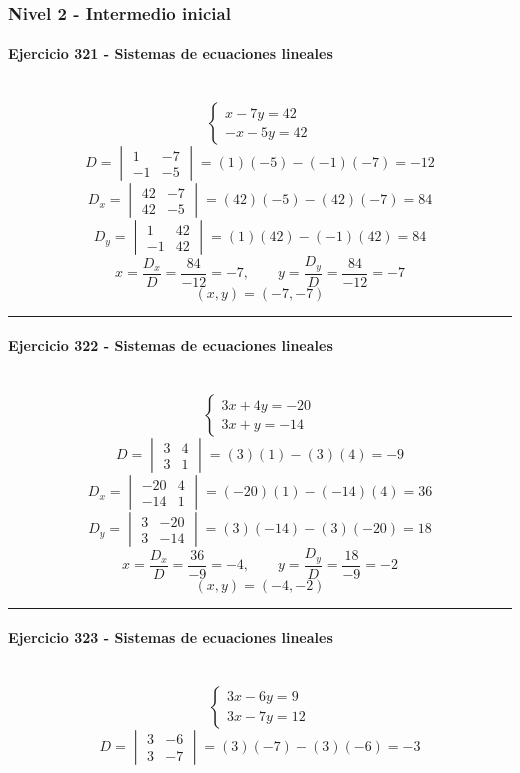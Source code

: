 \documentclass[10pt,a4paper]{article}
\newcommand{\res}[1]{\paragraph{#1}\mbox{}\\[-1.2em]}
\begin{document}
\subsubsection*{Nivel 2 - Intermedio inicial}
\res{Ejercicio 321 - Sistemas de ecuaciones lineales}
\[ \begin{cases}x - 7 y=42\\- x - 5 y=42\end{cases} \]
\[ D=\begin{vmatrix}1&-7\\-1&-5\end{vmatrix}=(1)(-5)-(-1)(-7)=-12 \]
\[ D_x=\begin{vmatrix}42&-7\\42&-5\end{vmatrix}=(42)(-5)-(42)(-7)=84 \]
\[ D_y=\begin{vmatrix}1&42\\-1&42\end{vmatrix}=(1)(42)-(-1)(42)=84 \]
\[ x=\frac{D_x}{D}=\frac{84}{-12}=-7,\qquad y=\frac{D_y}{D}=\frac{84}{-12}=-7 \]
\[ \boxed{(x,y)=(-7,-7)} \]
\vspace{1mm}\hrule\vspace{2mm}
\res{Ejercicio 322 - Sistemas de ecuaciones lineales}
\[ \begin{cases}3 x + 4 y=-20\\3 x + y=-14\end{cases} \]
\[ D=\begin{vmatrix}3&4\\3&1\end{vmatrix}=(3)(1)-(3)(4)=-9 \]
\[ D_x=\begin{vmatrix}-20&4\\-14&1\end{vmatrix}=(-20)(1)-(-14)(4)=36 \]
\[ D_y=\begin{vmatrix}3&-20\\3&-14\end{vmatrix}=(3)(-14)-(3)(-20)=18 \]
\[ x=\frac{D_x}{D}=\frac{36}{-9}=-4,\qquad y=\frac{D_y}{D}=\frac{18}{-9}=-2 \]
\[ \boxed{(x,y)=(-4,-2)} \]
\vspace{1mm}\hrule\vspace{2mm}
\res{Ejercicio 323 - Sistemas de ecuaciones lineales}
\[ \begin{cases}3 x - 6 y=9\\3 x - 7 y=12\end{cases} \]
\[ D=\begin{vmatrix}3&-6\\3&-7\end{vmatrix}=(3)(-7)-(3)(-6)=-3 \]
\end{document}
